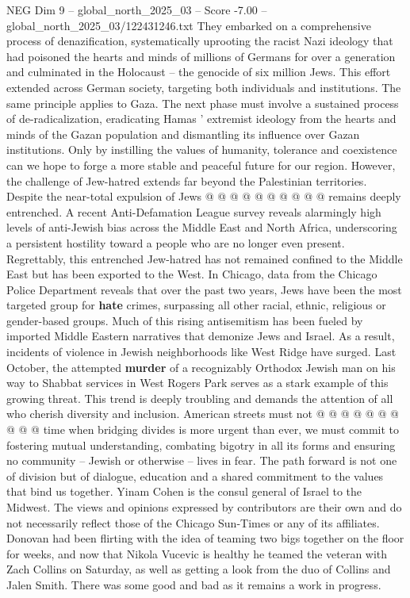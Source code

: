 \begin{textsample}{NEG Dim 9 – global\_north\_2025\_03 – Score -7.00 – global\_north\_2025\_03/122431246.txt}
They embarked on a comprehensive process of denazification, systematically uprooting the racist Nazi ideology that had poisoned the hearts and minds of millions of Germans for over a generation and culminated in the Holocaust -- the genocide of six million Jews.
This effort extended across German society, targeting both individuals and institutions.
The same principle applies to Gaza.
The next phase must involve a sustained process of de-radicalization, eradicating Hamas ' extremist ideology from the hearts and minds of the Gazan population and dismantling its influence over Gazan institutions.
Only by instilling the values of humanity, tolerance and coexistence can we hope to forge a more stable and peaceful future for our region.
However, the challenge of Jew-hatred extends far beyond the Palestinian territories.
Despite the near-total expulsion of Jews @ @ @ @ @ @ @ @ @ @ remains deeply entrenched.
A recent Anti-Defamation League survey reveals alarmingly high levels of anti-Jewish bias across the Middle East and North Africa, underscoring a persistent hostility toward a people who are no longer even present.
Regrettably, this entrenched Jew-hatred has not remained confined to the Middle East but has been exported to the West.
In Chicago, data from the Chicago Police Department reveals that over the past two years, Jews have been the most targeted group for \textbf{hate} crimes, surpassing all other racial, ethnic, religious or gender-based groups.
Much of this rising antisemitism has been fueled by imported Middle Eastern narratives that demonize Jews and Israel.
As a result, incidents of violence in Jewish neighborhoods like West Ridge have surged.
Last October, the attempted \textbf{murder} of a recognizably Orthodox Jewish man on his way to Shabbat services in West Rogers Park serves as a stark example of this growing threat.
This trend is deeply troubling and demands the attention of all who cherish diversity and inclusion.
American streets must not @ @ @ @ @ @ @ @ @ @ time when bridging divides is more urgent than ever, we must commit to fostering mutual understanding, combating bigotry in all its forms and ensuring no community -- Jewish or otherwise -- lives in fear.
The path forward is not one of division but of dialogue, education and a shared commitment to the values that bind us together.
Yinam Cohen is the consul general of Israel to the Midwest.
The views and opinions expressed by contributors are their own and do not necessarily reflect those of the Chicago Sun-Times or any of its affiliates.
Donovan had been flirting with the idea of teaming two bigs together on the floor for weeks, and now that Nikola Vucevic is healthy he teamed the veteran with Zach Collins on Saturday, as well as getting a look from the duo of Collins and Jalen Smith.
There was some good and bad as it remains a work in progress.

\end{textsample}

